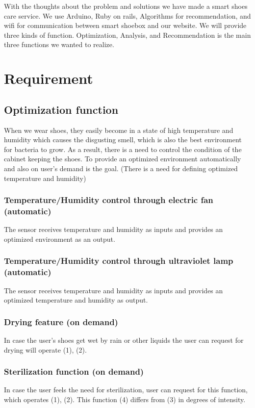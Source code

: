 \documentclass[conference]{IEEEtran}
\begin{document}
With the thoughts about the problem and solutions we have made a smart shoes care service. We use Arduino, Ruby on rails, Algorithms for recommendation, and wifi for communication between smart shoebox and our website.
We will provide three kinds of function. Optimization, Analysis, and Recommendation is the main three functions we wanted to realize.



\section{Requirement}

\subsection{Optimization function}
When we wear shoes, they easily become in a state of high temperature and humidity which causes the disgusting smell, which is also the best environment for bacteria to grow. As a result, there is a need to control the condition of the cabinet keeping the shoes. To provide an optimized environment automatically and also on user's demand is the goal. (There is a need for defining optimized temperature and humidity)\\
\subsubsection{Temperature/Humidity control through electric fan (automatic)}
The sensor receives temperature and humidity as inputs and provides an optimized environment as an output.\\
\subsubsection{Temperature/Humidity control through ultraviolet lamp (automatic)}
The sensor receives temperature and humidity as inputs and provides an optimized temperature and humidity as output.\\
\subsubsection{Drying feature (on demand)}
In case the user's shoes get wet by rain or other liquids the user can request for drying will operate (1), (2).\\
\subsubsection{Sterilization function (on demand)}
In case the user feels the need for sterilization, user can request for this function, which operates (1), (2).
This function (4) differs from (3) in degrees of intensity.\\
\end{document}

